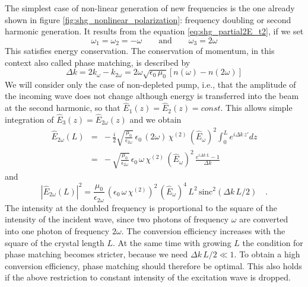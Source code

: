 The simplest case of non-linear generation of new frequencies
is the one already shown in figure \ref{fig:shg_nonlinear_polarization}: 
 frequency doubling or second harmonic generation. It results from the equation
\ref{eq:shg_partial2E_t2}, if we set
\begin{equation}
  \omega_1 = \omega_2 = - \omega \qquad \text{and} \qquad
  \omega_3 = 2\omega
\end{equation}
This satisfies  energy conservation. The
conservation of momentum, in this context also called phase matching, is described by
\begin{equation}
 \Delta k = 2 k_{\omega} - k_{2 \omega} = 2 \omega
 \sqrt{\epsilon_0 \, \mu_0} \left[ n(\omega) - n(2 \omega) \right]
\end{equation}
We will consider only the case of non-depleted pump, i.e., that the amplitude of the incoming wave does not change although energy is transferred into the beam at the second harmonic, so that
$\hat{E}_1(z) = \hat{E}_2(z)
= const$. This allows simple integration of $\hat{E}_3(z) = \hat{E}_{2\omega}(z)$
and we obtain
\begin{eqnarray}
 \hat{E}_{2\omega}(L) &=& - \, \frac{i}{2}   \sqrt{ \frac{\mu_0} {\epsilon_{2\omega}}}\,\epsilon_0
  \, (2 \omega) \, \chi^{(2)} \, (\hat{E}_{\omega})^2   \int_0^L  e^{i  \Delta k \,
  z'} dz  \\
  &= & %
- \,    \sqrt{ \frac{\mu_0} {\epsilon_{2\omega}}}\,\epsilon_0
  \,  \omega \, \chi^{(2)} \, (\hat{E}_{\omega})^2  \, \frac{  e^{i  \Delta k \,
  L} -1}{\Delta k}
\end{eqnarray}
and
\begin{equation}
  \left| \hat{E}_{2\omega}(L) \right|^2 = %
  \frac{\mu_0} {\epsilon_{2\omega}} \, \left(\epsilon_0
  \,  \omega \, \chi^{(2)} \right)^2 \, (\hat{E}_{\omega})^4  \, L^2 \, \text{sinc}^2 ( \Delta k \, L /2 )
   \quad . \label{eq:shg_partial2E_t2_t2}
\end{equation}
The intensity at the doubled frequency is proportional to
the square of the intensity of the incident wave, since two photons
of frequency $\omega$ are converted into one photon of frequency $2\omega$. The conversion efficiency increases with the
square of the crystal  length $L$. At the same time with 
growing $L$ the condition for phase matching becomes stricter, because we need 
$\Delta k \, L / 2 \ll 1 $. To obtain a high
conversion efficiency, phase matching should therefore be
 optimal. This also holds if the above restriction to
constant intensity of the excitation wave is dropped.

